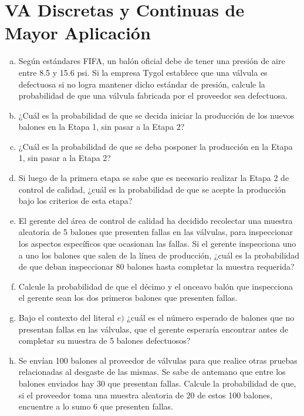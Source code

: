 \documentclass[11pt, spanish]{article}
\begin{document}
\section{VA Discretas y Continuas de Mayor Aplicación}

\begin{enumerate}[(a)]

\item Según estándares FIFA, un balón oficial debe de tener una presión de aire entre
8.5 y 15.6 psi. Si la empresa Tygol establece que una válvula es defectuosa si no logra
mantener dicho estándar de presión, calcule la probabilidad de que una válvula fabricada por
el proveedor sea defectuosa.

\item ¿Cuál es la probabilidad de que se decida iniciar la producción de los nuevos
balones en la Etapa 1, sin pasar a la Etapa 2?

\item ¿Cuál es la probabilidad de que se deba posponer la producción en la Etapa 1, sin
pasar a la Etapa 2?

\item Si luego de la primera etapa se sabe que es necesario realizar la Etapa 2 de
control de calidad, ¿cuál es la probabilidad de que se acepte la producción bajo los criterios de
esta etapa?

\item El gerente del área de control de calidad ha decidido recolectar una muestra
aleatoria de 5 balones que presenten fallas en las válvulas, para inspeccionar los aspectos
específicos que ocasionan las fallas. Si el gerente inspecciona uno a uno los balones que
salen de la línea de producción, ¿cuál es la probabilidad de que deban inspeccionar 80
balones hasta completar la muestra requerida?

\item Calcule la probabilidad de que el décimo y el onceavo balón que inspecciona el
gerente sean los dos primeros balones que presenten fallas.

\item Bajo el contexto del literal $e)$ ¿cuál es el número esperado de balones que no
presentan fallas en las válvulas, que el gerente esperaría encontrar antes de completar su
muestra de 5 balones defectuosos?

\item Se envían 100 balones al proveedor de válvulas para que realice otras pruebas
relacionadas al desgaste de las mismas. Se sabe de antemano que entre los balones
enviados hay 30 que presentan fallas. Calcule la probabilidad de que, si el proveedor toma
una muestra aleatoria de 20 de estos 100 balones, encuentre a lo sumo 6 que presenten
fallas.

\end{enumerate}
\end{document}
